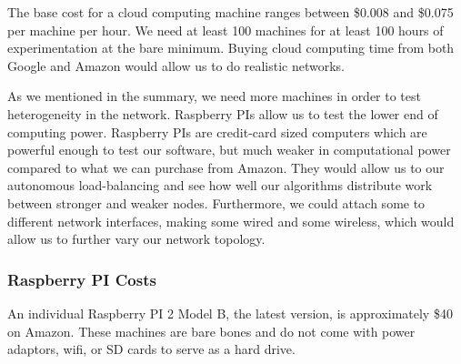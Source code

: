 \documentclass[12pt,a4paper]{article}
\begin{document}
The base cost for a cloud computing machine ranges between \$0.008 and \$0.075 per machine per hour.
We need at least 100 machines for at least 100 hours of experimentation at the bare minimum.
Buying cloud computing time from both Google and Amazon would allow us to do realistic networks.

As we mentioned in the summary, we need more machines in order to test heterogeneity in the network.
Raspberry PIs allow us to test the lower end of computing power.
Raspberry PIs are credit-card sized computers which are powerful enough to test our software, but much weaker in computational power compared to what we can purchase from Amazon.
They would allow us to our autonomous load-balancing and see how well our algorithms distribute work between stronger and weaker nodes.
Furthermore, we could attach some to different network interfaces, making some wired and some wireless, which would allow us to further vary our network topology.
%


\subsubsection*{Raspberry PI Costs}
An individual Raspberry PI 2 Model B, the latest version, is approximately \$40 on Amazon.
These machines are bare bones and do not come with power adaptors, wifi, or SD cards to serve as a hard drive.
\end{document}
